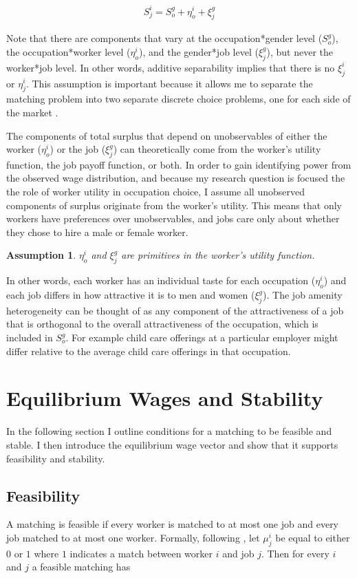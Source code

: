 \documentclass[12pt]{article}
\newtheorem{assumption}{Assumption}
\begin{document}
\begin{align}
S^i_j = S^g_o + \eta^i_o + \xi^g_j
\end{align}


Note that there are components that vary at the occupation*gender level ($S^g_o$), the occupation*worker level ($\eta^i_o$), and the gender*job level ($\xi^g_j$), but never the worker*job level. In other words, additive separability implies that there is no $\xi^i_j$ or $\eta^i_j$. This assumption is important because it allows me to separate the matching problem into two separate discrete choice problems, one for each side of the market \cite{Galichon2013}.

The components of total surplus that depend on unobservables of either the worker ($\eta^i_o$) or the job ($\xi^g_j$) can theoretically come from the worker's utility function, the job payoff function, or both. In order to gain identifying power from the observed wage distribution, and because my research question is focused the the role of worker utility in occupation choice, I assume all unobserved components of surplus originate from the worker's utility. This means that only workers have preferences over unobservables, and jobs care only about whether they chose to hire a male or female worker.

\begin{assumption}
$\eta^i_o$ and $\xi^g_j$ are primitives in the worker's utility function.
\end{assumption}

In other words, each worker has an individual taste for each occupation ($\eta^i_o$) and each job differs in how attractive it is to men and women ($\xi^g_j$). The job amenity heterogeneity can be thought of as any component of the attractiveness of a job that is orthogonal to the overall attractiveness of the occupation, which is included in $S^g_o$. For example child care offerings at a particular employer might differ relative to the average child care offerings in that occupation.


\section{Equilibrium Wages and Stability} \label{equilibrium}
In the following section I outline conditions for a matching to be feasible and stable. I then introduce the equilibrium wage vector and show that it supports feasibility and stability.

\subsection{Feasibility}
A matching is feasible if every worker is matched to at most one job and every job matched to at most one worker. Formally, following , let $\mu^i_j$ be equal to either $0$ or $1$ where $1$ indicates a match between worker $i$ and job $j$. Then for every $i$ and $j$ a feasible matching has
\end{document}
